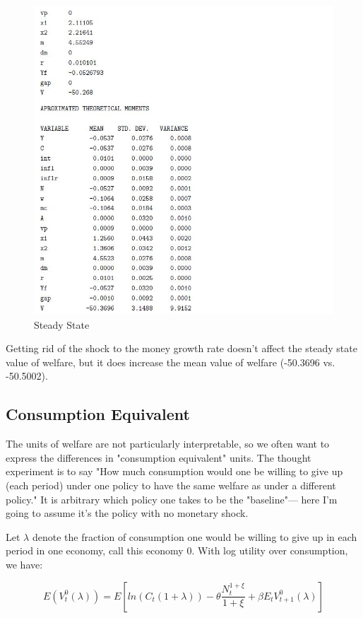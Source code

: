 \documentclass[10pt,math=newtx,citestyle=gb7714-2015,bibstyle=gb7714-2015]{elegantbook}
\begin{document}
{	\begin{figure}[htbp!]
		\centering
		\includegraphics[width=0.8\linewidth]{FIG/alternativeSS}
		\caption{Steady State}\label{6.3}
		\centering
	\end{figure}
	
	Getting rid of the shock to the money growth rate doesn't affect the steady state value of welfare, but it does increase the mean value of welfare (-50.3696 vs. -50.5002).
	
	\subsection{Consumption Equivalent}
	
	The units of welfare are not particularly interpretable, so we often want to express the differences in "consumption equivalent" units. The thought experiment is to say "How much consumption would one be willing to give up (each period) under one policy to have the same welfare as under a different policy." It is arbitrary which policy one takes to be the "baseline"--- here I'm going to assume it's the policy with no monetary shock.
	
	Let $\lambda$ denote the fraction of consumption one would be willing to give up in each period in one economy, call this economy 0. With log utility over consumption, we have:
	
	$$E(V_t^0(\lambda))=E\left[ln(C_t(1+\lambda))-\theta\frac{N_t^{1+\xi}}{1+\xi}+\beta E_tV_{t+1}^0(\lambda)\right]$$
	
}
\end{document}
